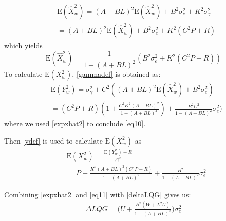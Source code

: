 \documentclass[journal,10pt]{IEEEtran}
\def\no{\nonumber}
\begin{document}
\begin{eqnarray}
&\mathrm{E}(\hat{X}_{w}^{2})=(A+BL)^{2}\mathrm{E}(\hat{X}_{w}^{2})+B^{2}\sigma_{e}^{2}+K^{2}\sigma_{\gamma}^{2}\no\\
&=(A+BL)^{2}\mathrm{E}(\hat{X}_{w}^{2})+B^{2}\sigma_{e}^{2}+K^{2}(C^{2}P+R)\no
\end{eqnarray}
which yields
\begin{equation}
\mathrm{E}(\hat{X}_{w}^{2})=\frac{1}{1-(A+BL)^{2}}(B^{2}\sigma_{e}^{2}+K^{2}(C^{2}P+R))\label{expxhat2}
\end{equation}
To calculate $\mathrm{E}(X_{w}^{2})$, \eqref{gammadef} is obtained
as:
\begin{eqnarray}
&\mathrm{E}(Y_{w}^{2})=\sigma_{\gamma}^{2}+C^{2}((A+BL)^{2}\mathrm{E}(\hat{X}_{w}^{2})+B^{2}\sigma_{e}^{2})\no\\
&=(C^{2}P+R)(1+\frac{C^{2}K^{2}(A+BL)^{2}}{1-(A+BL)^{2}})+\frac{B^{2}C^{2}}{1-(A+BL)^{2}}\sigma_{e}^{2})\label{eq10}
\end{eqnarray}
where we used \eqref{expxhat2} to conclude \eqref{eq10}.

Then \eqref{ydef} is used to calculate $\mathrm{E}(X_{w}^{2})$ as
\begin{eqnarray}
&\mathrm{E}(X_{w}^{2})=\frac{\mathrm{E}(Y_{w}^{2})-R}{C^{2}}\no\\
&=P+\frac{K^{2}(A+BL)^{2}(C^{2}P+R)}{1-(A+BL)^{2}}+\frac{B^{2}}{1-(A+BL)^{2}}\sigma_{e}^{2}\label{eq11}
\end{eqnarray}

Combining \eqref{expxhat2} and \eqref{eq11} with \eqref{deltaLQG}
gives us:
\begin{eqnarray}
\Delta
LQG=\bigg(U+\frac{B^{2}(W+L^{2}U)}{1-(A+BL)^{2}}\bigg)\sigma_{e}^{2}
\end{eqnarray}
\end{document}
